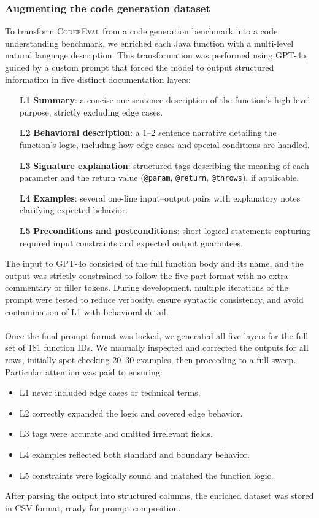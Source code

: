 \documentclass[a4paper]{usiinfbachelorproject}
\begin{document}
\subsubsection{Augmenting the code generation dataset}\label{sec:augmentation}
To transform \textsc{CoderEval} from a code generation benchmark into a code understanding benchmark, we enriched each Java function with a multi-level natural language description. This transformation was performed using GPT-4o, guided by a custom prompt that forced the model to output structured information in five distinct documentation layers:
\begin{enumerate}[leftmargin=15pt]
  \item[\textbf{L1}] \textbf{Summary}: a concise one-sentence description of the function's high-level purpose, strictly excluding edge cases.
  \item[\textbf{L2}] \textbf{Behavioral description}: a 1--2 sentence narrative detailing the function’s logic, including how edge cases and special conditions are handled.
  \item[\textbf{L3}] \textbf{Signature explanation}: structured tags describing the meaning of each parameter and the return value (\texttt{@param}, \texttt{@return}, \texttt{@throws}), if applicable.
  \item[\textbf{L4}] \textbf{Examples}: several one-line input–output pairs with explanatory notes clarifying expected behavior.
  \item[\textbf{L5}] \textbf{Preconditions and postconditions}: short logical statements capturing required input constraints and expected output guarantees.
\end{enumerate}
The input to GPT-4o consisted of the full function body and its name, and the output was strictly constrained to follow the five-part format with no extra commentary or filler tokens. During development, multiple iterations of the prompt were tested to reduce verbosity, ensure syntactic consistency, and avoid contamination of L1 with behavioral detail.\\
\\[2pt]
Once the final prompt format was locked, we generated all five layers for the full set of 181 function IDs. We manually inspected and corrected the outputs for all rows, initially spot-checking 20–30 examples, then proceeding to a full sweep. Particular attention was paid to ensuring:
\begin{itemize}[leftmargin=12pt]
  \item L1 never included edge cases or technical terms.
  \item L2 correctly expanded the logic and covered edge behavior.
  \item L3 tags were accurate and omitted irrelevant fields.
  \item L4 examples reflected both standard and boundary behavior.
  \item L5 constraints were logically sound and matched the function logic.
\end{itemize}
After parsing the output into structured columns, the enriched dataset was stored in CSV format, ready for prompt composition.
\end{document}
